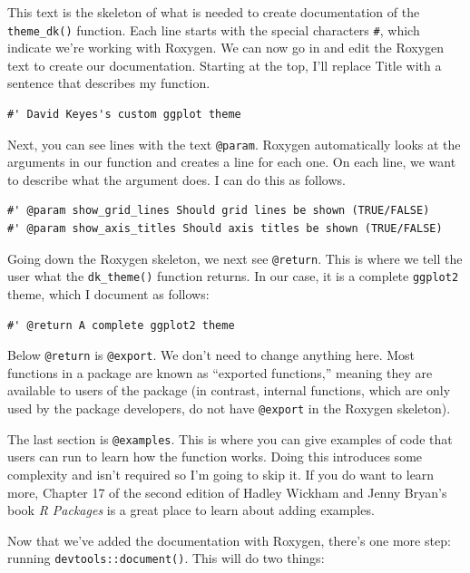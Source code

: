 \documentclass[
]{book}
\begin{document}
This text is the skeleton of what is needed to create documentation of the \texttt{theme\_dk()} function. Each line starts with the special characters \texttt{\#\textquotesingle{}}, which indicate we're working with Roxygen. We can now go in and edit the Roxygen text to create our documentation. Starting at the top, I'll replace Title with a sentence that describes my function.

\begin{verbatim}
#' David Keyes's custom ggplot theme 
\end{verbatim}

Next, you can see lines with the text \texttt{@param}. Roxygen automatically looks at the arguments in our function and creates a line for each one. On each line, we want to describe what the argument does. I can do this as follows.

\begin{verbatim}
#' @param show_grid_lines Should grid lines be shown (TRUE/FALSE)
#' @param show_axis_titles Should axis titles be shown (TRUE/FALSE) 
\end{verbatim}

Going down the Roxygen skeleton, we next see \texttt{@return}. This is where we tell the user what the \texttt{dk\_theme()} function returns. In our case, it is a complete \texttt{ggplot2} theme, which I document as follows:

\begin{verbatim}
#' @return A complete ggplot2 theme
\end{verbatim}

Below \texttt{@return} is \texttt{@export}. We don't need to change anything here. Most functions in a package are known as ``exported functions,'' meaning they are available to users of the package (in contrast, internal functions, which are only used by the package developers, do not have \texttt{@export} in the Roxygen skeleton).

The last section is \texttt{@examples}. This is where you can give examples of code that users can run to learn how the function works. Doing this introduces some complexity and isn't required so I'm going to skip it. If you do want to learn more, Chapter 17 of the second edition of Hadley Wickham and Jenny Bryan's book \emph{R Packages} is a great place to learn about adding examples.

Now that we've added the documentation with Roxygen, there's one more step: running \texttt{devtools::document()}. This will do two things:
\end{document}
